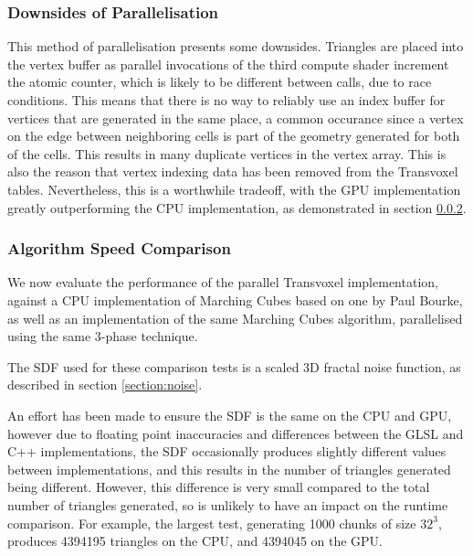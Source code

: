 \documentclass[11pt]{article}
\begin{document}
\subsubsection{Downsides of Parallelisation}
\label{section:downsides}
This method of parallelisation presents some downsides. Triangles are placed into the vertex buffer as parallel invocations of the third compute shader increment the atomic counter, which is likely to be different between calls, due to race conditions. This means that there is no way to reliably use an index buffer for vertices that are generated in the same place, a common occurance since a vertex on the edge between neighboring cells is part of the geometry generated for both of the cells. This results in many duplicate vertices in the vertex array. This is also the reason that vertex indexing data has been removed from the Transvoxel tables. Nevertheless, this is a worthwhile tradeoff, with the GPU implementation greatly outperforming the CPU implementation, as demonstrated in section \ref{section:GPUCPUcomparison}.



\subsubsection{Algorithm Speed Comparison}
\label{section:GPUCPUcomparison}
We now evaluate the performance of the parallel Transvoxel implementation, against a CPU implementation of Marching Cubes based on one by Paul Bourke\cite{bourke_1994}, as well as an implementation of the same Marching Cubes algorithm, parallelised using the same 3-phase technique.

The SDF used for these comparison tests is a scaled 3D fractal noise function, as described in section \ref{section:noise}.

An effort has been made to ensure the SDF is the same on the CPU and GPU, however due to floating point inaccuracies and differences between the GLSL and C++ implementations, the SDF occasionally produces slightly different values between implementations, and this results in the number of triangles generated being different. However, this difference is very small compared to the total number of triangles generated, so is unlikely to have an impact on the runtime comparison. For example, the largest test, generating 1000 chunks of size $32^3$, produces 4394195 triangles on the CPU, and 4394045 on the GPU.
\end{document}
